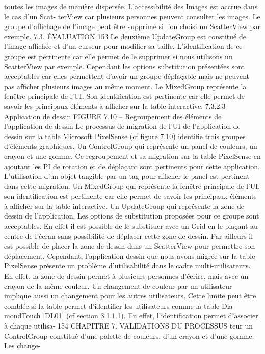 \documentclass{article}
\begin{document}
toutes les images de manière dispersée. L’accessibilité des Images est accrue dans le cas d’un Scat-
terView car plusieurs personnes peuvent consulter les images. Le groupe d’afﬁchage de l’image peut
être supprimé si l’on choisi un ScatterView par exemple.
7.3. ÉVALUATION
153
Le deuxième UpdateGroup est constitué de l’image afﬁchée et d’un curseur pour modiﬁer sa
taille. L’identiﬁcation de ce groupe est pertinente car elle permet de le supprimer si nous utilisons
un ScatterView par exemple. Cependant les options substitution présentées sont acceptables car elles
permettent d’avoir un groupe déplaçable mais ne peuvent pas afﬁcher plusieurs images au même
moment.
Le MixedGroup représente la fenêtre principale de l’UI. Son identiﬁcation est pertinente car elle
permet de savoir les principaux éléments à afﬁcher sur la table interactive.
7.3.2.3
Application de dessin
FIGURE 7.10 – Regroupement des éléments de l’application de dessin
Le processus de migration de l’UI de l’application de dessin sur la table Microsoft PixelSense (cf
ﬁgure 7.10) identiﬁe trois groupes d’éléments graphiques.
Un ControlGroup qui représente un panel de couleurs, un crayon et une gomme. Ce regroupement
et sa migration sur la table PixelSense en ajoutant les PI de rotation et de déplaçant sont pertinents
pour cette application. L’utilisation d’un objet tangible par un tag pour afﬁcher le panel est pertinent
dans cette migration.
Un MixedGroup qui représente la fenêtre principale de l’UI, son identiﬁcation est pertinente car
elle permet de savoir les principaux éléments à afﬁcher sur la table interactive.
Un UpdateGroup qui représente la zone de dessin de l’application. Les options de substitution
proposées pour ce groupe sont acceptables. En effet il est possible de le substituer avec un Grid en
le plaçant au centre de l’écran sans possibilité de déplacer cette zone de dessin. Par ailleurs il est
possible de placer la zone de dessin dans un ScatterView pour permettre son déplacement. Cependant,
l’application dessin que nous avons migrée sur la table PixelSense présente un problème d’utilisabilité
dans le cadre multi-utilisateurs. En effet, la zone de dessin permet à plusieurs personnes d’écrire, mais
avec un crayon de la même couleur. Un changement de couleur par un utilisateur implique aussi un
changement pour les autres utilisateurs.
Cette limite peut être comblée si la table permet d’identiﬁer les utilisateurs comme la table Dia-
mondTouch [DL01] (cf section 3.1.1.1). En effet, l’identiﬁcation permet d’associer à chaque utilisa-
154
CHAPITRE 7. VALIDATIONS DU PROCESSUS
teur un ControlGroup constitué d’une palette de couleurs, d’un crayon et d’une gomme. Les change-
\end{document}
